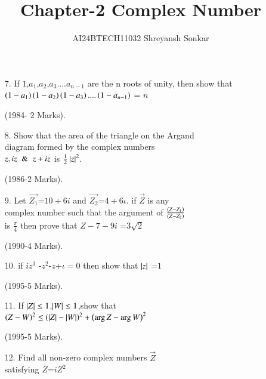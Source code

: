 \documentclass[journal]{IEEEtran}
\theoremstyle{remark}
\begin{document}

\vspace{3cm}

\title{Chapter-2 Complex Number}
\author{AI24BTECH11032 Shreyansh Sonkar
}
\maketitle
\newpage
\bigskip

\renewcommand{\thefigure}{\theenumi}
\renewcommand{\thetable}{\theenumi}
\begin{enumerate}




\item[7.] If $1$,$a_1$,$a_2$,$a_3$....$a_{n-1}$
 are the n roots of unity, then show that $\left(1-a_1\right)\left(1-a_2\right)\left(1-a_3\right)....\left(1-a_{n-1}\right)$ = $n$  
 
  \hfill (1984- 2 Marks).\\



\item[8.]  Show that the area of the 
  triangle on the Argand\\ 
  diagram formed by the complex 
  numbers\\
  $z,  iz \And z+  iz$ 
  is $\frac{1}{2}\left\vert z\right\vert^2$.

  \hfill (1986-2 Marks).\\

\item[9.] Let $\vec{Z_1}$=$10+6i$ and $\vec{Z_2}$=$4+6\iota$. if $\vec{Z}$ is any \\
complex number such that the argument of ${\frac{\left(Z-Z_1\right)}{\left(Z-Z_2
\right)}}$\\
is  ${\frac{\pi}{4}}$ then prove that $Z-7-9i$ =$3\sqrt{2}$

 \hfill(1990-4 Marks).\\


\item[10.] if {$iz^{3}$ -$z^2$-$z$+$\iota=0$} then show that $\left\vert z\right\vert$ =$1$

\hfill(1995-5 Marks).\\

\item[11.] If $\left\vert Z\right\vert\le1$,$\left\vert W\right\vert\le1$,show that\\
$\left(Z-W\right)^2\le\left(\left\vert Z\right\vert-\left\vert W\right\vert\right)^2+\left(\arg Z-\arg W\right)^2$ 

\hfill(1995-5 Marks). \\


\item[12.] Find all non-zero complex numbers $\vec{Z}$ \\
satisfying $\bar Z$=$ iZ^2 $ 


\end{enumerate}
\end{document}
